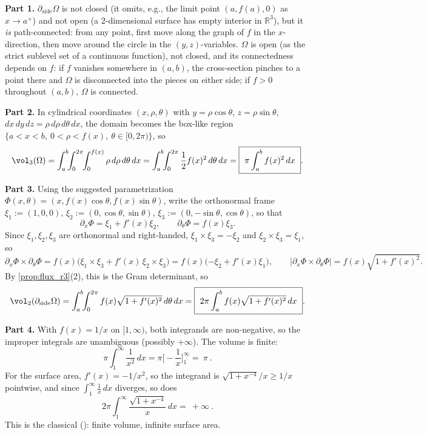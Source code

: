 \begin{exercisesolution}
\textbf{Part 1.} $\partial_{\mathrm{side}}\Omega$ is not closed (it omits, e.g., the limit
point $(a,f(a),0)$ as $x\to a^+$) and not open (a $2$-dimensional surface has empty interior
in $\mathbb{R}^3$), but it \emph{is} path-connected: from any point, first move along the
graph of $f$ in the $x$-direction, then move around the circle in the $(y,z)$-variables.
$\Omega$ is open (as the strict sublevel set of a continuous function), not closed, and its
connectedness depends on $f$: if $f$ vanishes somewhere in $(a,b)$, the cross-section pinches
to a point there and $\Omega$ is disconnected into the pieces on either side; if $f>0$
throughout $(a,b)$, $\Omega$ is connected.

\textbf{Part 2.} In cylindrical coordinates $(x,\rho,\theta)$ with $y=\rho\cos\theta$,
$z=\rho\sin\theta$, $dx\,dy\,dz = \rho\,d\rho\,d\theta\,dx$, the domain becomes the box-like
region $\{a<x<b,\ 0<\rho<f(x),\ \theta\in[0,2\pi)\}$, so
\[\vol_3(\Omega) = \int_a^b\!\!\int_0^{2\pi}\!\!\int_0^{f(x)} \rho\,d\rho\,d\theta\,dx
  = \int_a^b\!\!\int_0^{2\pi} \frac12 f(x)^2\,d\theta\,dx
  = \boxed{\ \pi\int_a^b f(x)^2\,dx\ }.\]

\textbf{Part 3.} Using the suggested parametrization $\Phi(x,\theta) = (x,f(x)\cos\theta,
f(x)\sin\theta)$, write the orthonormal frame $\xi_1:=(1,0,0)$, $\xi_2:=(0,\cos\theta,
\sin\theta)$, $\xi_3:=(0,-\sin\theta,\cos\theta)$, so that
\[\partial_x\Phi = \xi_1 + f'(x)\xi_2, \qquad \partial_\theta\Phi = f(x)\xi_3.\]
Since $\xi_1,\xi_2,\xi_3$ are orthonormal and right-handed, $\xi_1\times\xi_3=-\xi_2$ and
$\xi_2\times\xi_3=\xi_1$, so
\[\partial_x\Phi\times\partial_\theta\Phi = f(x)\big(\xi_1\times\xi_3
  + f'(x)\,\xi_2\times\xi_3\big) = f(x)\big({-\xi_2}+f'(x)\xi_1\big), \qquad
  \lvert\partial_x\Phi\times\partial_\theta\Phi\rvert = f(x)\sqrt{1+f'(x)^2}.\]
By \cref{prop:flux_r3}(2), this is the Gram determinant, so
\[\vol_2(\partial_{\mathrm{side}}\Omega) = \int_a^b\!\!\int_0^{2\pi} f(x)\sqrt{1+f'(x)^2}\,
  d\theta\,dx = \boxed{\ 2\pi\int_a^b f(x)\sqrt{1+f'(x)^2}\,dx\ }.\]

\textbf{Part 4.} With $f(x)=1/x$ on $[1,\infty)$, both integrands are non-negative, so the
improper integrals are unambiguous (possibly $+\infty$). The volume is finite:
\[\pi\int_1^\infty \frac{1}{x^2}\,dx = \pi\Big[-\frac1x\Big]_1^\infty = \boxed{\ \pi\ }.\]
For the surface area, $f'(x) = -1/x^2$, so the integrand is $\sqrt{1+x^{-4}}/x \geq 1/x$
pointwise, and since $\int_1^\infty \frac1x\,dx$ diverges, so does
\[2\pi\int_1^\infty \frac{\sqrt{1+x^{-4}}}{x}\,dx = \boxed{\ +\infty\ }.\]
This is the classical  (): finite
volume, infinite surface area.


\end{exercisesolution}
